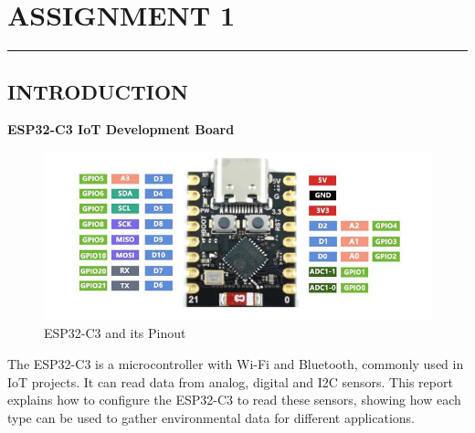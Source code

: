 \onehalfspacing
\chapter{ASSIGNMENT 1}
\par\noindent\rule{\textwidth}{0.4pt}%

\section{INTRODUCTION}
         \textbf{ESP32-C3 IoT Development Board}
         \begin{figure}[H]
             \centering
             \includegraphics[width=0.7\linewidth]{ESP32-C3.png}
             \caption{ESP32-C3 and its Pinout}
             \label{fig:enter-label}
         \end{figure}
         The ESP32-C3 is a microcontroller with Wi-Fi and Bluetooth, commonly used in IoT projects. It can read data from analog, digital and I2C sensors. This report explains how to configure the ESP32-C3 to read these sensors, showing how each type can be used to gather environmental data for different applications. 
